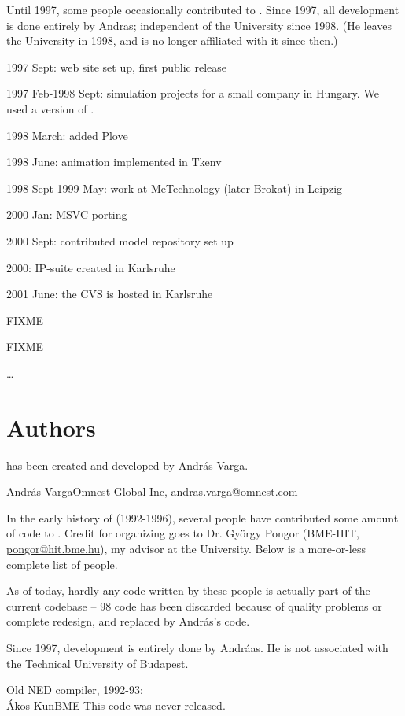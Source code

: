 Until 1997, some people occasionally contributed to {\opp}.
Since 1997, all development is done entirely by Andras;
independent of the University since 1998. (He leaves
the University in 1998, and is no longer affiliated with it
since then.)

1997 Sept: web site set up, first public release

1997 Feb-1998 Sept: simulation projects for a small company in
Hungary. We used a version of {\opp}.

1998 March: added Plove

1998 June: animation implemented in Tkenv

1998 Sept-1999 May: work at MeTechnology (later Brokat) in Leipzig

2000 Jan: MSVC porting

2000 Sept: contributed model repository set up

2000: IP-suite created in Karlsruhe

2001 June: the CVS is hosted in Karlsruhe

FIXME

\tbf{}

FIXME

\dots





\section{Authors}

{\opp} has been created and developed by Andr\'{a}s Varga.

\tab Andr\'{a}s Varga\tab \tab Omnest Global Inc, andras.varga@omnest.com

In the early history of {\opp} (1992-1996), several people have
contributed some amount of code to {\opp}.
Credit for organizing goes to Dr. Gy\"{o}rgy Pongor (BME-HIT,
\href{mailto:pongor@hit.bme.hu}{pongor@hit.bme.hu}),
my advisor at the University. Below is a more-or-less complete list of people.

As of today, hardly any code written by these people
is actually part of the current codebase -- 98%
code has been discarded because of quality problems or complete
redesign, and replaced by Andr\'{a}s's code.

Since 1997, development is entirely done by Andr\'{a}as. He is
not associated with the Technical University of Budapest.

Old NED compiler, 1992-93:\\
\tab \'{A}kos Kun\tab \tab BME
This code was never released.

